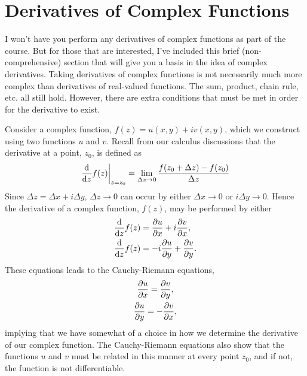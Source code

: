 \documentclass[final,a4paper,12pt]{article}
\theoremstyle{definition}
\begin{document}
\section{Derivatives of Complex Functions}
I won't have you perform any derivatives of complex functions as part of the
course.  But for those that are interested, I've included this brief
(non-comprehensive) section that will give you a basis in the idea of complex
derivatives.  Taking derivatives of complex functions is not necessarily much
more complex than derivatives of real-valued functions.  The sum, product, chain
rule, etc. all still hold.  However, there are extra conditions that must be met
in order for the derivative to exist.

Consider a complex function, $f(z) = u(x,y) + i v(x,y)$, which we construct
using two functions $u$ and $v$.  Recall from our calculus discussions that the
derivative at a point, $z_0$, is defined as
\begin{equation*}
    \left. \dv{}{z} f(z) \right|_{z = z_0} =
        \lim_{\Delta z \to 0} \frac{f(z_0 + \Delta z) - f(z_0)}{\Delta z}
\end{equation*}
Since $\Delta z = \Delta x + i \Delta y$, $\Delta z \to 0$ can occur by either
$\Delta x \to 0$ or $i \Delta y \to 0$.  Hence the derivative of a complex
function, $f(z)$, may be performed by either
\begin{align}
    \dv{}{z} f(z) &= \pdv{u}{x} + i \pdv{v}{x} ,\label{eq:dzdx}\\
    \dv{}{z} f(z) &= -i\pdv{u}{y} + \pdv{v}{y} .\\
    \label{eq:dzdy}
\end{align}
These equations leads to the Cauchy-Riemann equations,
\begin{gather}
    \pdv{u}{x} = \pdv{v}{y} ,\\
    \pdv{u}{y} = -\pdv{v}{x} ,
\end{gather}
implying that we have somewhat of a choice in how we determine the derivative of
our complex function.  The Cauchy-Riemann equations also show that the functions
$u$ and $v$ must be related in this manner at every point $z_0$, and if not, the
function is not differentiable.
\end{document}
